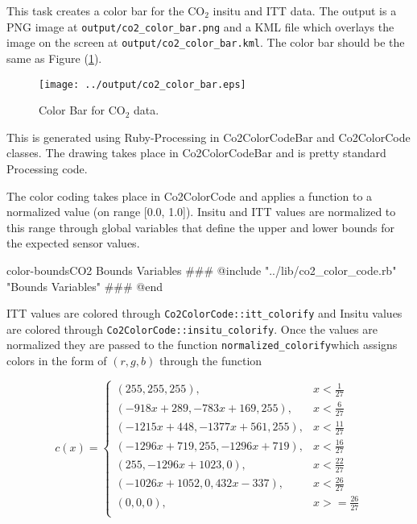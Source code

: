 \documentclass[12pt]{article}
\begin{document}
This task creates a color bar for the CO$_2$ insitu and ITT data.  The output is a PNG image at \texttt{output/co2\_color\_bar.png} and a KML file which overlays the image on the screen at \texttt{output/co2\_color\_bar.kml}.  The color bar should be the same as Figure (\ref{co2-color-bar}).   

\begin{figure}
\centering
\texttt{[image: ../output/co2\_color\_bar.eps]}
\caption{Color Bar for CO$_2$ data.}
\label{co2-color-bar}
\end{figure}

This is generated using Ruby-Processing in Co2ColorCodeBar and Co2ColorCode classes.  The drawing takes place in Co2ColorCodeBar and is pretty standard Processing code.  

The color coding takes place in Co2ColorCode and applies a function to a normalized value (on range [0.0, 1.0]).  Insitu and ITT values are normalized to this range through global variables that define the upper and lower bounds for the expected sensor values.

\begin{code}{color-bounds}{CO2 Bounds Variables}
### @include "../lib/co2_color_code.rb" "Bounds Variables"
### @end
\end{code}

ITT values are colored through \texttt{Co2ColorCode::itt\_colorify} and Insitu values are colored through \texttt{Co2ColorCode::insitu\_colorify}.  Once the values are normalized they are passed to the function \texttt{normalized\_colorify}which assigns colors in the form of $(r,g,b)$ through the function

\begin{equation}
\label{normalized-colorify}
c(x)= \begin{cases}
(255,255,255), & x < \frac{1}{27} \\
(-918x+289,-783x+169,255), & x < \frac{6}{27} \\
(-1215x+448,-1377x+561,255), & x < \frac{11}{27} \\
(-1296x+719,255,-1296x+719), & x < \frac{16}{27} \\
(255,-1296x+1023,0), & x < \frac{22}{27} \\
(-1026x+1052,0,432x-337), & x < \frac{26}{27} \\
(0,0,0), & x >= \frac{26}{27} \\
\end{cases}
\end{equation}
\end{document}
